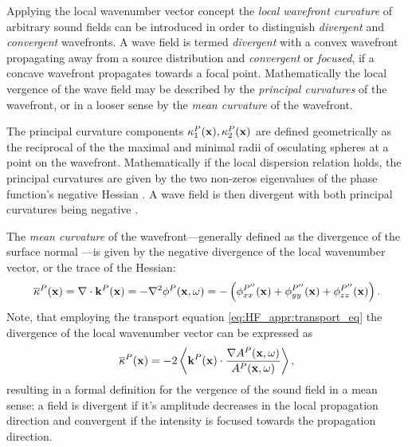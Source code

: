 Applying the local wavenumber vector concept the \emph{local wavefront curvature} of arbitrary sound fields can be introduced in order to distinguish \emph{divergent} and \emph{convergent} wavefronts.
A wave field is termed \emph{divergent} with a convex wavefront propagating away from a source distribution and \emph{convergent} or \emph{focused}, if a concave wavefront propagates towards a focal point.
Mathematically the local vergence of the wave field may be described by the \emph{principal curvatures} of the wavefront, or in a looser sense by the \emph{mean curvature} of the wavefront.

The principal curvature components $\kappa_1^P(\mathbf{x}),\kappa_2^P(\mathbf{x})$ are defined geometrically as the reciprocal of the the maximal and minimal radii of osculating spheres at a point on the wavefront.
Mathematically if the local dispersion relation holds, the principal curvatures are given by the two non-zeros eigenvalues of the phase function's negative Hessian \cite{Hartmann1999}.
A wave field is then divergent with both principal curvatures being negative \cite{HF_and_Pulse_Scattering1992, Bleistein1984, Arnold1986}.

The \emph{mean curvature} of the wavefront---generally defined as the divergence of the surface normal \cite{Goldman2005}---is given by the negative divergence of the local wavenumber vector, or the trace of the Hessian:
%
\begin{equation}
\overline{\kappa}^P(\mathbf{x}) = \nabla \cdot \mathbf{k}^P(\mathbf{x}) = -\nabla^2 \phi^P(\mathbf{x},\omega) = -\left(  \phi^{P''}_{xx}(\mathbf{x}) + \phi^{P''}_{yy}(\mathbf{x}) + \phi^{P''}_{zz}(\mathbf{x}) \right).
\label{eq:HF_appr:curvature}
\end{equation}
Note, that employing the transport equation \eqref{eq:HF_appr:transport_eq} the divergence of the local wavenumber vector can be expressed as
\begin{equation}
\overline{\kappa}^P(\mathbf{x}) = -2 \left< \mathbf{k}^P(\mathbf{x})\cdot \frac{ \nabla A^P(\mathbf{x},\omega) }{A^P(\mathbf{x},\omega)}\right>,
\end{equation}
resulting in a formal definition for the vergence of the sound field in a mean sense: a field is divergent if it's amplitude decreases in the local propagation direction and convergent if the intensity is focused towards the propagation direction.

